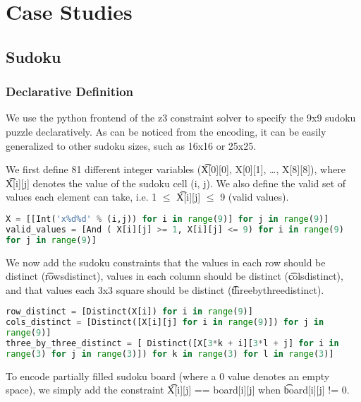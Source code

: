 \section{Case Studies}

\subsection{Sudoku}

\subsubsection{Declarative Definition}
We use the python frontend of the z3 constraint solver to specify the 9x9
sudoku puzzle declaratively. As can be noticed from the encoding, it
can be easily generalized to other sudoku sizes, such as 16x16 or
25x25.

We first define 81 different integer variables (\t{X[0][0], X[0][1], \ldots,
X[8][8]}), where \t{X[i][j]} denotes the value of the sudoku cell (i, j). We
also define the valid set of values each element can take, i.e. 1 $\leq$
\t{X[i][j]} $\leq$ 9 (valid values).

\singlespace
\begin{lstlisting}[language=python, frame = single]
X = [[Int('x%d%d' % (i,j)) for i in range(9)] for j in range(9)]
valid_values = [And ( X[i][j] >= 1, X[i][j] <= 9) for i in range(9)
for j in range(9)]
\end{lstlisting}
\doublespace

We now add the sudoku constraints that the values in each row should be
distinct (\t{rows\textunderscore distinct}), values in each column should be distinct
(\t{cols\textunderscore distinct}), and that values each 3x3 square should be distinct
(\t{three\textunderscore by\textunderscore three\textunderscore distinct}).

\singlespace
\begin{lstlisting}[language=python, frame = single]
row_distinct = [Distinct(X[i]) for i in range(9)]
cols_distinct = [Distinct([X[i][j] for i in range(9)]) for j in
range(9)] 
three_by_three_distinct = [ Distinct([X[3*k + i][3*l + j] for i in
range(3) for j in range(3)]) for k in range(3) for l in range(3)]

\end{lstlisting}
\doublespace

To encode partially filled sudoku board (where a 0 value denotes an
empty space), we simply add the constraint \t{X[i][j] == board[i][j]} when
\t{board[i][j]} != 0. 

